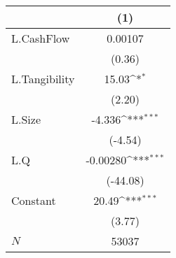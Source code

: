 {
\def\sym#1{\ifmmode^{#1}\else\(^{#1}\)\fi}
\begin{tabular}{l*{1}{c}}
\hline\hline
            &\multicolumn{1}{c}{(1)}         \\
\hline
L.CashFlow  &     0.00107         \\
            &      (0.36)         \\
L.Tangibility&       15.03\sym{*}  \\
            &      (2.20)         \\
L.Size      &      -4.336\sym{***}\\
            &     (-4.54)         \\
L.Q         &    -0.00280\sym{***}\\
            &    (-44.08)         \\
Constant    &       20.49\sym{***}\\
            &      (3.77)         \\
\hline
\(N\)       &       53037         \\
\hline\hline
\end{tabular}
}
